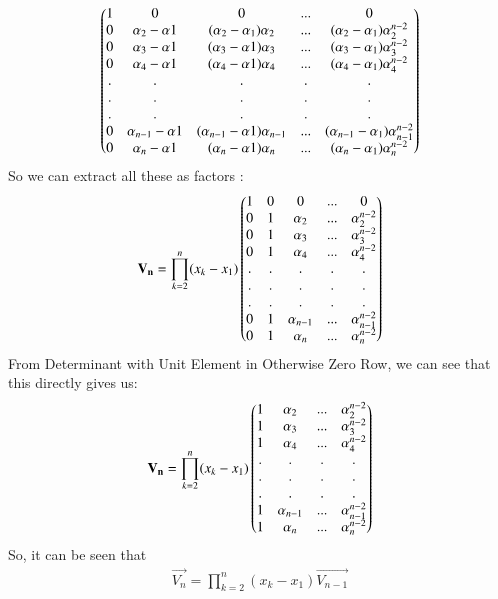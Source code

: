 \documentclass[journal,12pt,twocolumn]{IEEEtran}
\begin{document}
\begin{align}
    \begin{pmatrix}1 & 0 & 0 & ... & 0 \\
    0 & \alpha_2-\alpha1 & (\alpha_2-\alpha_1)\alpha_2 & ... &(\alpha_2-\alpha_1)\alpha_2^{n-2}\\
    0 & \alpha_3-\alpha1 & (\alpha_3-\alpha1)\alpha_3 & ... &(\alpha_3-\alpha_1)\alpha_3^{n-2}\\
    0 & \alpha_4-\alpha1& (\alpha_4-\alpha1)\alpha_4 & ... &(\alpha_4-\alpha_1)\alpha_4^{n-2} \\
    . & . & . & . & . \\
    . & . & . & . & . \\
    . & . & . & . & . \\
    0 & \alpha_{n-1}-\alpha1& (\alpha_{n-1}-\alpha1)\alpha_{n-1} & ... &(\alpha_{n-1}-\alpha_1)\alpha_{n-1}^{n-2}\\
    0 & \alpha_n-\alpha1& (\alpha_n-\alpha1)\alpha_n & ... &(\alpha_n-\alpha_1)\alpha_n^{n-2} 
    \end{pmatrix}
\end{align}
So we can extract all these as factors :
\begin{align}
\mathbf{V_n} = \prod_{k=2}^n(x_k - x_1)
    \begin{pmatrix}1 & 0 & 0 & ... & 0 \\
    0 & 1 & \alpha_2 & ... & \alpha_2^{n-2}\\
    0 & 1 & \alpha_3 & ... & \alpha_3^{n-2}\\
    0 & 1 & \alpha_4 & ... & \alpha_4^{n-2} \\
    . & . & . & . & . \\
    . & . & . & . & . \\
    . & . & . & . & . \\
    0 & 1 & \alpha_{n-1} & ... & \alpha_{n-1}^{n-2}\\
    0 & 1 & \alpha_n & ... & \alpha_n^{n-2} 
    \end{pmatrix}
\end{align}
From Determinant with Unit Element in Otherwise Zero Row, we can see that this directly gives us:
\begin{align}
\mathbf{V_n} = \prod_{k=2}^n(x_k - x_1)
    \begin{pmatrix}
    1 & \alpha_2 & ... & \alpha_2^{n-2}\\
    1 & \alpha_3 & ... & \alpha_3^{n-2}\\
    1 & \alpha_4 & ... & \alpha_4^{n-2} \\
    . & . & . & . \\
    . & . & . & . \\
    . & . & . & . \\
    1 & \alpha_{n-1} & ... & \alpha_{n-1}^{n-2}\\
    1 & \alpha_n & ... & \alpha_n^{n-2} 
    \end{pmatrix}
\end{align}
So, it can be seen that 
\begin{align}
    \vec{V_n} = \prod_{k=2}^n(x_k - x_1)\vec{V_{n-1}}
\end{align}
\end{document}

